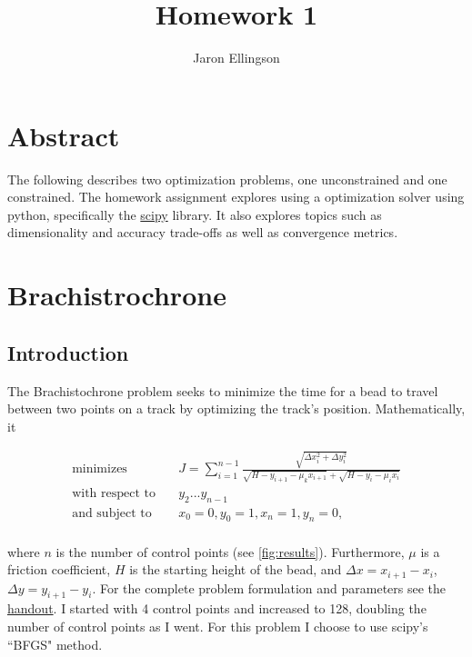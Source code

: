 \documentclass{article}
\begin{document}
\title{Homework 1}
\author{Jaron Ellingson}
\maketitle

\section*{Abstract}

The following describes two optimization problems, one unconstrained and one constrained. The homework assignment explores using a optimization solver using python, specifically the \href{https://docs.scipy.org/doc/scipy/reference/generated/scipy.optimize.minimize.html}{scipy} library. It also explores topics such as dimensionality and accuracy trade-offs as well as convergence metrics.

\section{Brachistrochrone}

\subsection{Introduction}

The Brachistochrone problem seeks to minimize the time for a bead to travel between two points on a track by optimizing the track's position. Mathematically, it  

\begin{equation*}
\begin{aligned}
\text{minimizes} & \quad J=\sum_{i=1}^{n-1} \frac{\sqrt{\Delta x_i^2+\Delta y_i^2}}{\sqrt{H-y_{i+1}-\mu_{k}x_{i+1}} + \sqrt{H-y_i-\mu_i x_i} } \\
\text{with respect to} & \quad y_2 ... y_{n-1} \\
\text{and subject to} & \quad x_0=0, y_0=1, x_n=1, y_n=0,  \\
\end{aligned}
\end{equation*}

where $n$ is the number of control points (see \cref{fig:results}). Furthermore, $\mu$ is a friction coefficient, $H$ is the starting height of the bead, and $\Delta x = x_{i+1}-x_i$, $\Delta y = y_{i+1}-y_i$. For the complete problem formulation and parameters see the \href{https://byu.box.com/shared/static/iig80eoctek0lrs60avsmjxndc9sgk2m.pdf}{handout}.  I started with 4 control points and increased to 128, doubling the number of control points as I went. For this problem I choose to use scipy's ``BFGS" method.
\end{document}
